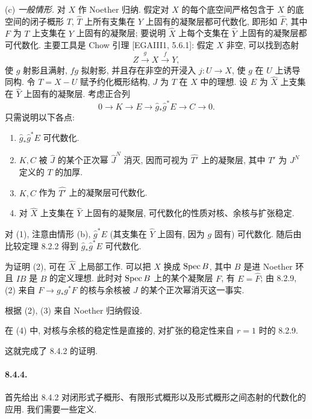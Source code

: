 (c) \emph{一般情形.} 对 $X$ 作 Noether 归纳. 假定对 $X$ 的每个底空间严格包含于 $X$ 的底空间的闭子概形 $T$, $\widehat T$ 上所有支集在 $\widehat Y$ 上固有的凝聚层都可代数化, 即形如 $\widehat F$, 其中 $F$ 为 $T$ 上支集在 $Y$ 上固有的凝聚层; 要说明 $\widehat X$ 上每个支集在 $\widehat Y$ 上固有的凝聚层都可代数化. 主要工具是 Chow 引理 [EGAIII1, 5.6.1]: 假定 $X$ 非空, 可以找到态射
\[Z\xrightarrow{g}X\xrightarrow{f}Y,\]
使 $g$ 射影且满射, $fg$ 拟射影, 并且存在非空的开浸入 $j:U\to X$, 使 $g$ 在 $U$ 上诱导同构. 令 $T=X-U$ 赋予约化概形结构, $J$ 为 $T$ 在 $X$ 中的理想. 设 $E$ 为 $\widehat X$ 上支集在 $\widehat Y$ 上固有的凝聚层. 考虑正合列
\begin{equation}0\longrightarrow K\longrightarrow E\longrightarrow\widehat g_*\widehat g^*E\longrightarrow C\longrightarrow0.\tag{*}\label{ch08:eq843star}\end{equation}
只需说明以下各点:
\begin{enumerate}
\item[(1)] $\widehat g_*\widehat g^*E$ 可代数化.
\item[(2)] $K,C$ 被 $\widehat J$ 的某个正次幂 $\widehat J^N$ 消灭, 因而可视为 $\widehat{T'}$ 上的凝聚层, 其中 $T'$ 为 $J^N$ 定义的 $T$ 的加厚.
\item[(3)] $K,C$ 作为 $\widehat{T'}$ 上的凝聚层可代数化.
\item[(4)] 对 $\widehat X$ 上支集在 $\widehat Y$ 上固有的凝聚层, 可代数化的性质对核、余核与扩张稳定.
\end{enumerate}
对 (1), 注意由情形 (b), $\widehat g^*E$ (其支集在 $\widehat Y$ 上固有, 因为 $g$ 固有) 可代数化. 随后由比较定理 8.2.2 得到 $\widehat g_*\widehat g^*E$ 可代数化.

为证明 (2), 可在 $\widehat X$ 上局部工作. 可以把 $X$ 换成 $\operatorname{Spec} B$, 其中 $B$ 是进 Noether 环且 $IB$ 是 $B$ 的定义理想. 此时对 $\operatorname{Spec} B$ 上的某个凝聚层 $F$, 有 $E=\widehat F$; 由 8.2.9, (2) 来自 $F\to g_*g^*F$ 的核与余核被 $J$ 的某个正次幂消灭这一事实.

根据 (2), (3) 来自 Noether 归纳假设.

在 (4) 中, 对核与余核的稳定性是直接的, 对扩张的稳定性来自 $r=1$ 时的 8.2.9.

这就完成了 8.4.2 的证明.

\paragraph{8.4.4.}
首先给出 8.4.2 对闭形式子概形、有限形式概形以及形式概形之间态射的代数化的应用. 我们需要一些定义.

